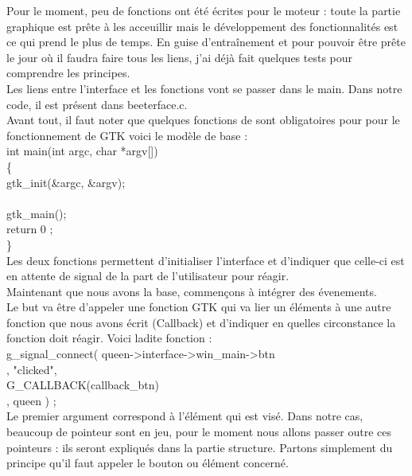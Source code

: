 \documentclass[11pt,french,a4paper]{report}
\begin{document}
Pour le moment, peu de fonctions ont été écrites pour le moteur : toute la partie graphique est prête à les acceuillir 
mais le développement des fonctionnalités est ce qui prend le plus de temps. En guise d'entraînement et pour 
pouvoir être prête le jour où il faudra faire tous les liens, j'ai déjà fait quelques tests pour comprendre les principes. \\

Les liens entre l'interface et les fonctions vont se passer dans le main. Dans notre code, il est présent dans beeterface.c.\\

Avant tout, il faut noter que quelques fonctions de sont obligatoires pour pour le fonctionnement de GTK voici le modèle de base : \\

int main(int argc, char *argv[])    \\ 
\{ \\
 gtk\_init(&argc, &argv); \\
 [votre code] \\
 gtk\_main(); \\
 return 0 ; \\
\} \\

Les deux fonctions permettent d'initialiser l'interface et d'indiquer que celle-ci est en attente de signal
de la part de l'utilisateur pour réagir. \\

Maintenant que nous avons la base, commençons à intégrer des évenements. \\
Le but va être d'appeler une fonction GTK qui va lier un éléments à une autre fonction que nous avons écrit  (Callback) 
et d'indiquer en quelles circonstance la fonction doit réagir. Voici ladite fonction : \\

g\_signal\_connect( queen->interface->win\_main->btn \\,
                   "clicked", \\
                    G\_CALLBACK(callback\_btn) \\,
                    queen ) ; \\

Le premier argument correspond à l'élément qui est visé. Dans notre cas, beaucoup de pointeur sont en jeu,
pour le moment nous allons passer outre ces pointeurs : ils seront expliqués dans la partie structure. 
Partons simplement du principe qu'il faut appeler le bouton ou élément concerné.  \\
\end{document}
